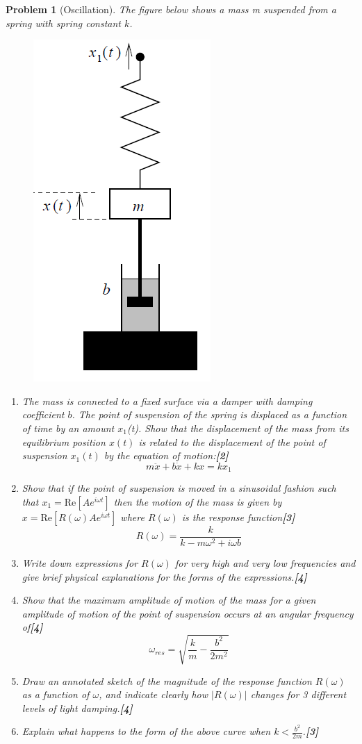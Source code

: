 \documentclass[a4paper]{article}
\theoremstyle{new}
\newtheorem{qns}{Problem}[subsection]
\begin{document}
\begin{qns}[Oscillation]
The figure below shows a mass m suspended from a spring with spring constant $k$.
\begin{figure}[H]
    \centering
    \includegraphics[scale=0.6]{2010P1B6Q.PNG}
\end{figure}
\begin{enumerate}[label=(\roman*)]
\item The mass is connected to a fixed surface via a damper with damping coefficient $b$. The point of suspension of the spring is displaced as a function of time by an amount $x_1$(t). Show that the displacement of the mass from its equilibrium position $x(t)$ is related to the displacement of the point of suspension $x_1(t)$ by the equation of motion:\hfill\textbf{[2]}
$$m\ddot{x}+b\dot{x}+kx=kx_1$$
\item Show that if the point of suspension is moved in a sinusoidal fashion such that $x_1 =\text{Re}[A e^{i\omega t}]$ then the motion of the mass is given by $x =\text{Re}[R(\omega)A e^{i\omega t}]$ where $R(\omega)$ is the response function\hfill\textbf{[3]}
$$R(\omega)=\frac{k}{k-m\omega^2+i\omega b}$$
\item Write down expressions for $R(\omega)$ for very high and very low frequencies and give brief physical explanations for the forms of the expressions.\hfill\textbf{[4]}
\item Show that the maximum amplitude of motion of the mass for a given amplitude of motion of the point of suspension occurs at an angular frequency of\hfill\textbf{[4]}
$$\omega_{res}=\sqrt{\frac{k}{m}-\frac{b^2}{2m^2}}$$
\item Draw an annotated sketch of the magnitude of the response function $R(\omega)$ as a function of $\omega$, and indicate clearly how $|R(\omega)|$ changes for 3 different levels of light damping.\hfill\textbf{[4]}
\item Explain what happens to the form of the above curve when $k<\frac{b^2}{2m}$.\hfill\textbf{[3]}
\end{enumerate}
\end{qns}
\end{document}
